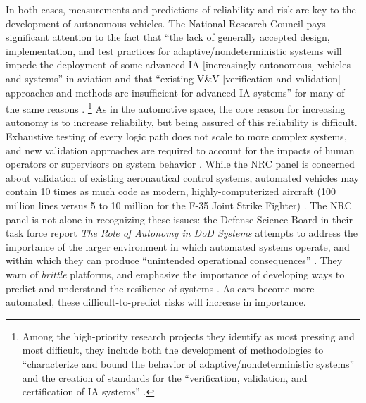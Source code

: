 In both cases, measurements and predictions of reliability and risk
are key to the development of autonomous vehicles. The National Research Council pays
significant attention to the fact that ``the lack of generally
accepted design, implementation, and test practices for
adaptive/nondeterministic systems will impede the deployment of some
advanced IA [increasingly autonomous] vehicles and systems'' in aviation and that
``existing V\&V [verification and
  validation] approaches and methods are insufficient for advanced IA
systems'' for many of the same reasons \cite[p. 2]{NRCAutonomy}.
\footnote{Among the high-priority research projects they identify as
most pressing and most difficult, they include both the development of
methodologies to ``characterize and bound the behavior of
adaptive/nondeterministic systems'' and the creation of standards for
the ``verification, validation, and certification of IA
systems'' \cite[p. 4]{NRCAutonomy}.} As in the automotive space, the
core reason for increasing autonomy is to increase reliability, but
being assured of this reliability is difficult. Exhaustive testing of
every logic path does not scale to more complex systems, and new 
validation approaches are required to account for the impacts of human
operators or supervisors on system behavior \cite[p.
  39--40]{NRCAutonomy}. While
the NRC panel is concerned about validation of existing aeronautical
control systems, automated vehicles may contain 10 times as much code
as modern, highly-computerized aircraft (100 million lines versus 5 to
10 million for the F-35 Joint Strike Fighter)
\cite{reutersF35}.
The NRC panel is not alone in recognizing these 
issues: the Defense Science Board in their task force report \emph{The
  Role of Autonomy in DoD Systems} attempts to address the importance
of the larger environment in which automated systems operate, and
within which they can produce ``unintended operational
consequences'' \cite[p. 2]{DSB}. They warn of \emph{brittle}
platforms, and emphasize the importance of developing ways to predict
and understand the resilience of systems \cite[p. 7, 11]{DSB}. As cars
become more automated, these difficult-to-predict risks will increase
in importance.




